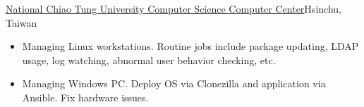 \documentclass[letterpaper,11pt]{article}
\makeatletter
\newcommand{\resumeItemTwo}[1]{
  \item\small{
    {#1 \vspace{-2pt}}
  }
}
\newcommand{\resumeSubheading}[4]{
  \vspace{1pt}%
    \begin{tabular*}{0.97\textwidth}{l@{\extracolsep{\fill}}r}
      \textbf{#1} & #2 \\
      \textit{\small#3} & \textit{\small #4} \\
    \end{tabular*}\vspace{-5pt}
}
\newcommand{\resumeSubHeadingListStart}{}%
\newcommand{\resumeSubHeadingListEnd}{}%
\newcommand{\resumeItemListStart}{\begin{itemize}}
\newcommand{\resumeItemListEnd}{\end{itemize}\vspace{-5pt}}
\makeatother
\begin{document}
      {\href{https://it.cs.nycu.edu.tw/}{National Chiao Tung University Computer Science Computer Center}}{Hsinchu, Taiwan}
      \resumeItemListStart
      \resumeItemTwo{Managing Linux workstations. Routine jobs include package updating, LDAP usage, log watching, abnormal user behavior checking, etc.}
      \resumeItemTwo{Managing Windows PC. Deploy OS via Clonezilla and application via Ansible. Fix hardware issues.}
      \resumeItemListEnd
  \resumeSubHeadingListEnd
\end{document}
